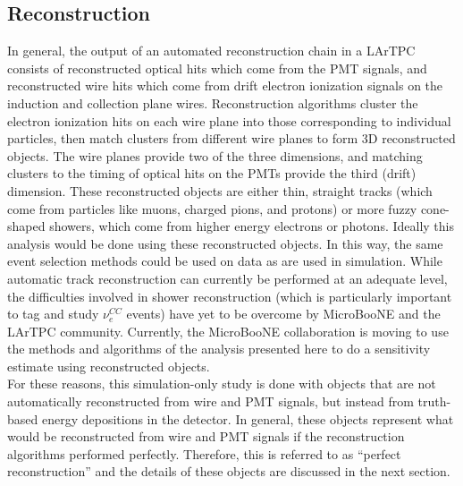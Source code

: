 \subsection{Reconstruction}
In general, the output of an automated reconstruction chain in a LArTPC consists of reconstructed optical hits which come from the PMT signals, and reconstructed wire hits which come from drift electron ionization signals on the induction and collection plane wires. Reconstruction algorithms cluster the electron ionization hits on each wire plane into those corresponding to individual particles, then match clusters from different wire planes to form 3D reconstructed objects. The wire planes provide two of the three dimensions, and matching clusters to the timing of optical hits on the PMTs provide the third (drift) dimension. These reconstructed objects are either thin, straight tracks (which come from particles like muons, charged pions, and protons) or more fuzzy cone-shaped showers, which come from higher energy electrons or photons. Ideally this analysis would be done using these reconstructed objects. In this way, the same event selection  methods could be used on data as are used in simulation. While automatic track reconstruction can currently be performed at an adequate level, the difficulties involved in shower reconstruction (which is particularly important to tag and study $\nu_e^{CC}$ events) have yet to be overcome by MicroBooNE and the LArTPC community. Currently, the MicroBooNE collaboration is moving to use the methods and algorithms of the analysis presented here to do a sensitivity estimate using reconstructed objects.\\

For these reasons, this simulation-only study is done with objects that are not automatically reconstructed from wire and PMT signals, but instead from truth-based energy depositions in the detector. In general, these objects represent what would be reconstructed from wire and PMT signals if the reconstruction algorithms performed perfectly. Therefore, this is referred to as ``perfect reconstruction'' and the details of these objects are discussed in the next section. 

